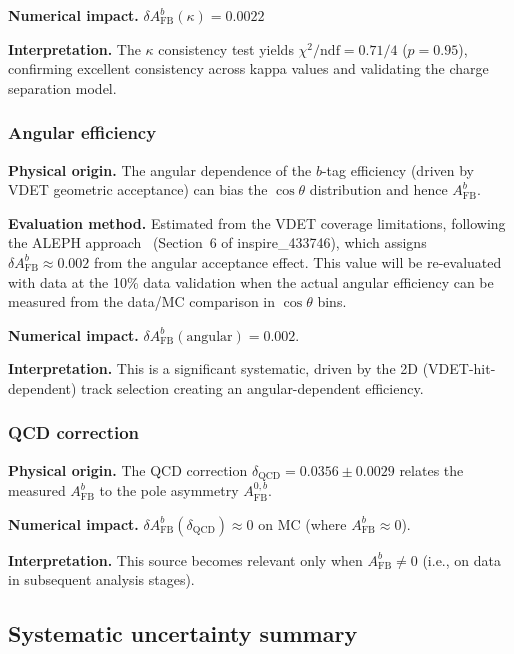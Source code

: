 \documentclass[11pt,a4paper]{article}
\begin{document}
\textbf{Numerical impact.}
$\delta A_\mathrm{FB}^b(\kappa) = 0.0022$

\textbf{Interpretation.} The $\kappa$ consistency test yields $\chi^2/\mathrm{ndf} = 0.71/4$
($p = 0.95$), confirming excellent consistency across kappa values and validating the
charge separation model.

\subsubsection{Angular efficiency}
\label{sec:syst_angular}

\textbf{Physical origin.} The angular dependence of the $b$-tag efficiency (driven by
VDET geometric acceptance) can bias the $\cos\theta$ distribution and hence $A_\mathrm{FB}^b$.

\textbf{Evaluation method.} Estimated from the VDET coverage limitations, following the
ALEPH approach~\cite{ALEPH:Rb:1996} (Section~6 of inspire\_433746), which assigns
$\delta A_\mathrm{FB}^b \approx 0.002$ from the angular acceptance effect. This value
will be re-evaluated with data at the 10\% data validation when the actual angular efficiency can be
measured from the data/MC comparison in $\cos\theta$ bins.

\textbf{Numerical impact.}
$\delta A_\mathrm{FB}^b(\mathrm{angular}) = 0.002$.

\textbf{Interpretation.} This is a significant systematic, driven by the 2D (VDET-hit-dependent)
track selection creating an angular-dependent efficiency.

\subsubsection{QCD correction}
\label{sec:syst_qcd}

\textbf{Physical origin.} The QCD correction $\delta_\mathrm{QCD} = 0.0356 \pm 0.0029$
relates the measured $A_\mathrm{FB}^b$ to the pole asymmetry $A_\mathrm{FB}^{0,b}$.

\textbf{Numerical impact.}
$\delta A_\mathrm{FB}^b(\delta_\mathrm{QCD}) \approx 0$ on MC (where $A_\mathrm{FB}^b \approx 0$).

\textbf{Interpretation.} This source becomes relevant only when $A_\mathrm{FB}^b \neq 0$
(i.e., on data in subsequent analysis stages).

\subsection{Systematic uncertainty summary}
\label{sec:syst_summary}
\end{document}
